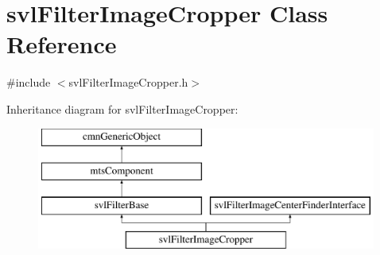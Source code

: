 \hypertarget{classsvl_filter_image_cropper}{}\section{svl\+Filter\+Image\+Cropper Class Reference}
\label{classsvl_filter_image_cropper}


{\ttfamily \#include $<$svl\+Filter\+Image\+Cropper.\+h$>$}

Inheritance diagram for svl\+Filter\+Image\+Cropper\+:\begin{figure}[H]
\begin{center}
\leavevmode
\includegraphics[height=4.000000cm]{d8/dca/classsvl_filter_image_cropper}
\end{center}
\end{figure}
